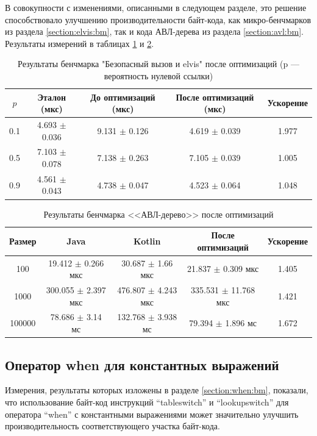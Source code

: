 В совокупности с изменениями, описанными в следующем разделе, это решение способствовало улучшению
производительности байт-кода, как микро-бенчмарков из раздела \ref{section:elvis:bm}, так и кода
АВЛ-дерева из раздела \ref{section:avl:bm}.
Результаты измерений в таблицах \ref{bm:elvis:o} и \ref{bm:stars:o}.

\begin{table}[h]
\begin{center}
\begin{tabular}{|c|c|c|c|c|} \hline
$p$ & Эталон (мкс) & До оптимизаций (мкс) & После оптимизаций (мкс) & Ускорение \\ \hline
0.1 & 4.693 $\pm$ 0.036 & 9.131 $\pm$ 0.126 & 4.619 $\pm$ 0.039 & 1.977\\ \hline
0.5 & 7.103 $\pm$ 0.078 & 7.138 $\pm$ 0.263 & 7.105 $\pm$ 0.039 & 1.005\\ \hline
0.9 & 4.561 $\pm$ 0.043 & 4.738 $\pm$ 0.047 & 4.523 $\pm$ 0.064 & 1.048\\ \hline
\end{tabular}
\caption{Результаты бенчмарка "Безопасный вызов и elvis" после оптимизаций \newline (p --- вероятность нулевой ссылки)}
\label{bm:elvis:o}
\end{center}
\end{table}

\begin{table}[h]
\begin{center}
\begin{tabular}{|c|c|c|c|c|} \hline
Размер & Java & Kotlin & После оптимизаций & Ускорение \\ \hline
100 & 19.412 $\pm$ 0.266 мкс & 30.687 $\pm$ 1.66 мкс & 21.837 $\pm$ 0.309 мкс & 1.405\\ \hline
1000 & 300.055 $\pm$ 2.397 мкс & 476.807 $\pm$ 4.243 мкс & 335.531 $\pm$ 11.768 мкс & 1.421\\ \hline
100000 & 78.686 $\pm$ 3.14 мс & 132.768 $\pm$ 3.938 мс & 79.394 $\pm$ 1.896 мс & 1.672\\ \hline
\end{tabular}
\caption{Результаты бенчмарка <<АВЛ-дерево>> после оптимизаций}
\label{bm:stars:o}
\end{center}
\end{table}

\subsection{Оператор when для константных выражений}
\label{section:when:opt}
Измерения, результаты которых изложены в разделе \ref{section:when:bm}, показали, что использование
байт-код инструкций ``tableswitch'' и ``lookupswitch'' для оператора ``when'' с константными
выражениями может значительно улучшить производительность соответствующего участка байт-кода.

